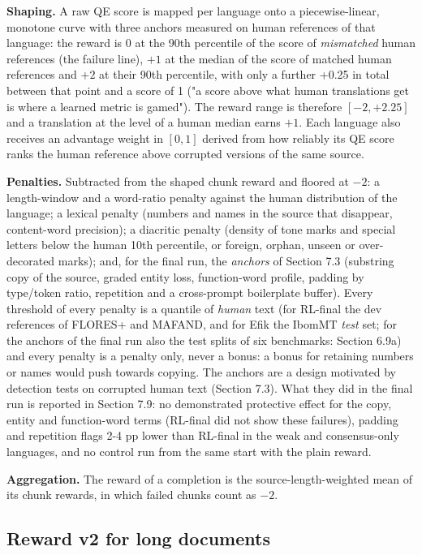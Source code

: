 \textbf{Shaping.} A raw QE score is mapped per language onto a piecewise-linear, monotone curve with three anchors measured on human references of that language: the reward is 0 at the 90th percentile of the score of \emph{mismatched} human references (the failure line), \(+1\) at the median of the score of matched human references and \(+2\) at their 90th percentile, with only a further +0.25 in total between that point and a score of 1 ("a score above what human translations get is where a learned metric is gamed"). The reward range is therefore \([-2, +2.25]\) and a translation at the level of a human median earns \(+1\). Each language also receives an advantage weight in \([0, 1]\) derived from how reliably its QE score ranks the human reference above corrupted versions of the same source.

\textbf{Penalties.} Subtracted from the shaped chunk reward and floored at \(-2\): a length-window and a word-ratio penalty against the human distribution of the language; a lexical penalty (numbers and names in the source that disappear, content-word precision); a diacritic penalty (density of tone marks and special letters below the human 10th percentile, or foreign, orphan, unseen or over-decorated marks); and, for the final run, the \emph{anchors} of Section 7.3 (substring copy of the source, graded entity loss, function-word profile, padding by type/token ratio, repetition and a cross-prompt boilerplate buffer). Every threshold of every penalty is a quantile of \emph{human} text (for RL-final the dev references of FLORES+ and MAFAND, and for Efik the IbomMT \emph{test} set; for the anchors of the final run also the test splits of six benchmarks: Section 6.9a) and every penalty is a penalty only, never a bonus: a bonus for retaining numbers or names would push towards copying. The anchors are a design motivated by detection tests on corrupted human text (Section 7.3). What they did in the final run is reported in Section 7.9: no demonstrated protective effect for the copy, entity and function-word terms (RL-final did not show these failures), padding and repetition flags 2-4 pp lower than RL-final in the weak and consensus-only languages, and no control run from the same start with the plain reward.

\textbf{Aggregation.} The reward of a completion is the source-length-weighted mean of its chunk rewards, in which failed chunks count as \(-2\).

\subsection{Reward v2 for long documents}\label{reward-v2-for-long-documents}

